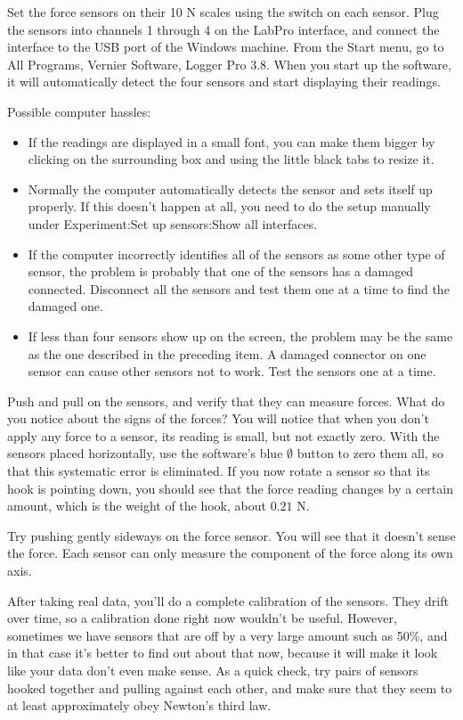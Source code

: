 Set the force sensors on their 10 N scales using the switch on each
sensor.
Plug the sensors into channels 1 through 4 on the LabPro interface, and connect the
interface to the USB port of the Windows machine.
From the Start menu, go to All Programs, Vernier Software, Logger Pro 3.8.
When you start up the software, it will automatically detect
the four sensors and start displaying their readings. 


Possible computer hassles:
\begin{itemize}
\item[] If the readings are displayed in a small font, you can make them bigger
by clicking on the surrounding box and using the little black tabs to resize it.
\item[] Normally the computer automatically detects the sensor and sets itself up
properly. If this doesn't happen at all, you need to do the setup manually under
Experiment:Set up sensors:Show all interfaces.
\item[] If the computer incorrectly identifies all of the sensors as some other type of
sensor,
the problem is probably that one of the sensors has a damaged connected. Disconnect
all the sensors and test them one at a time to find the damaged one.
\item[] If less than four sensors show up on the screen, the problem may be the same
as the one described in the preceding item. A damaged connector on one sensor can
cause other sensors not to work. Test the sensors one at a time.
\end{itemize}

Push and pull on the sensors, and verify that they can measure forces.
What do you notice about the signs of the forces?
You will notice that when you don't apply any force to a sensor, its reading
is small, but not exactly zero.
With the sensors placed horizontally, use the software's blue $\emptyset$ button to zero them all, so that
this systematic error is eliminated. If you now rotate a sensor so that its hook
is pointing down, you should see that the force reading changes by a certain amount,
which is the weight of the hook, about $0.21$ N.

Try pushing gently sideways on the force sensor. You will see that it doesn't
sense the force.
Each sensor can only measure the component of the force along its
own axis.

After taking real data, you'll do a complete calibration of the
sensors. They drift over time, so a calibration done right now wouldn't be useful.
However, sometimes we have sensors that are off by a very large
amount such as 50\%, and in that case it's better to find out about that now, because
it will make it look like your data don't even make sense. As a quick check, try
pairs of sensors hooked together and pulling against each other, and make sure that
they seem to at least approximately obey Newton's third law.

